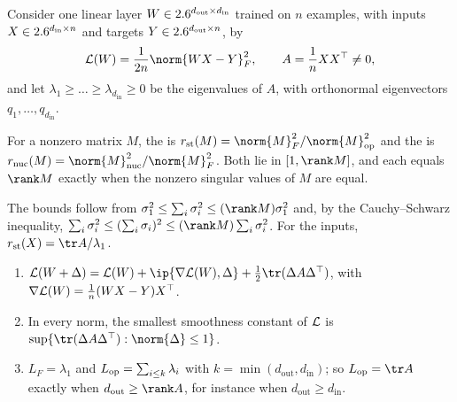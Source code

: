 \begin{refsection}
Consider one linear layer $W\in2.6^{d_{\mathrm{out}}\times d_{\mathrm{in}}}$ trained on $n$ examples, with inputs $X\in2.6^{d_{\mathrm{in}}\times n}$ and targets $Y\in2.6^{d_{\mathrm{out}}\times n}$, by
\[
  \Loss(W)=\frac1{2n}\norm{WX-Y}_F^2,\qquad A=\frac1nXX^\top\ne0 ,
\]
and let $\lambda_1\ge\dots\ge\lambda_{d_{\mathrm{in}}}\ge0$ be the eigenvalues of $A$, with orthonormal eigenvectors $q_1,\dots,q_{d_{\mathrm{in}}}$.

\begin{definition}\label{def:spectral:ranks}
For a nonzero matrix $M$, the  is $\spectralrst(M)=\norm{M}_F^2/\norm{M}_{\op}^2$ and the  is $\spectralrnuc(M)=\norm{M}_{\nuc}^2/\norm{M}_F^2$. Both lie in $[1,\rank M]$, and each equals $\rank M$ exactly when the nonzero singular values of $M$ are equal.
\end{definition}

The bounds follow from $\sigma_1^2\le\sum_i\sigma_i^2\le(\rank M)\sigma_1^2$ and, by the Cauchy--Schwarz inequality, $\sum_i\sigma_i^2\le(\sum_i\sigma_i)^2\le(\rank M)\sum_i\sigma_i^2$. For the inputs, $\spectralrst(X)=\tr A/\lambda_1$.

\begin{lemma}\label{lem:spectral:layer}
\begin{enumerate}
\item $\Loss(W+\Delta)=\Loss(W)+\ip{\nabla\Loss(W),\Delta}+\frac12\tr(\Delta A\Delta^\top)$, with $\nabla\mathcal{L}(W)=\frac1n(WX-Y)X^\top$.
\item In every norm, the smallest smoothness constant of $\mathcal{L}$ is $\sup\{\tr(\Delta A\Delta^\top):\norm{\Delta}\le1\}$.
\item $L_F=\lambda_1$ and $L_{\mathrm{op}}=\sum_{i\le k}\lambda_i$ with $k=\min(d_{\mathrm{out}},d_{\mathrm{in}})$; so $L_{\op}=\tr A$ exactly when $d_{\mathrm{out}}\ge\rank A$, for instance when $d_{\mathrm{out}}\ge d_{\mathrm{in}}$.
\end{enumerate}
\end{lemma}


\end{refsection}
